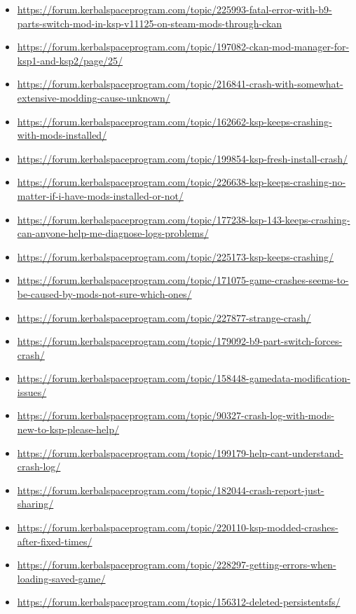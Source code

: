 \begin{itemize}
  \item \url{https://forum.kerbalspaceprogram.com/topic/225993-fatal-error-with-b9-parts-switch-mod-in-ksp-v11125-on-steam-mods-through-ckan}
  \item \url{https://forum.kerbalspaceprogram.com/topic/197082-ckan-mod-manager-for-ksp1-and-ksp2/page/25/}
  \item \url{https://forum.kerbalspaceprogram.com/topic/216841-crash-with-somewhat-extensive-modding-cause-unknown/}
  \item \url{https://forum.kerbalspaceprogram.com/topic/162662-ksp-keeps-crashing-with-mods-installed/}
  \item \url{https://forum.kerbalspaceprogram.com/topic/199854-ksp-fresh-install-crash/}
  \item \url{https://forum.kerbalspaceprogram.com/topic/226638-ksp-keeps-crashing-no-matter-if-i-have-mods-installed-or-not/}
  \item \url{https://forum.kerbalspaceprogram.com/topic/177238-ksp-143-keeps-crashing-can-anyone-help-me-diagnose-logs-problems/}
  \item \url{https://forum.kerbalspaceprogram.com/topic/225173-ksp-keeps-crashing/}
  \item \url{https://forum.kerbalspaceprogram.com/topic/171075-game-crashes-seems-to-be-caused-by-mods-not-sure-which-ones/}
  \item \url{https://forum.kerbalspaceprogram.com/topic/227877-strange-crash/}
  \item \url{https://forum.kerbalspaceprogram.com/topic/179092-b9-part-switch-forces-crash/}
  \item \url{https://forum.kerbalspaceprogram.com/topic/158448-gamedata-modification-issues/}
  \item \url{https://forum.kerbalspaceprogram.com/topic/90327-crash-log-with-mods-new-to-ksp-please-help/}
  \item \url{https://forum.kerbalspaceprogram.com/topic/199179-help-cant-understand-crash-log/}
  \item \url{https://forum.kerbalspaceprogram.com/topic/182044-crash-report-just-sharing/}
  \item \url{https://forum.kerbalspaceprogram.com/topic/220110-ksp-modded-crashes-after-fixed-times/}
  \item \url{https://forum.kerbalspaceprogram.com/topic/228297-getting-errors-when-loading-saved-game/}
  \item \url{https://forum.kerbalspaceprogram.com/topic/156312-deleted-persistentsfs/}

\end{itemize}
